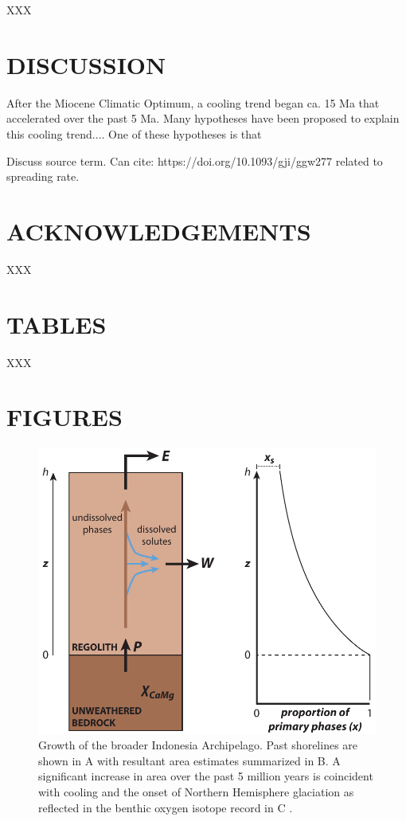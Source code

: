 \documentclass[11pt,letterpaper]{article}
\begin{document}
XXX

\section*{DISCUSSION}

After the Miocene Climatic Optimum, a cooling trend began ca. 15 Ma that accelerated over the past 5 Ma. Many hypotheses have been proposed to explain this cooling trend.... One of these hypotheses is that

Discuss source term. Can cite: https://doi.org/10.1093/gji/ggw277 related to spreading rate.

\section*{ACKNOWLEDGEMENTS \label{sec:ACKNOWLEDGEMENTS}}

XXX

\clearpage
\newpage

\section*{TABLES}

XXX

\clearpage
\newpage

\section*{FIGURES}

\begin{figure}
    \centering
    \includegraphics{Manuscript/Figures/regolith_schematic.pdf}
    \caption{Growth of the broader Indonesia Archipelago. Past shorelines are shown in A with resultant area estimates summarized in B. A significant increase in area over the past 5 million years is coincident with cooling and the onset of Northern Hemisphere glaciation as reflected in the benthic oxygen isotope record in C \cite{Zachos2008a}.}
    \label{fig:my_label}
\end{figure}
\end{document}

